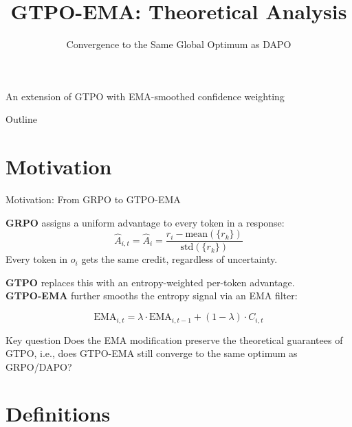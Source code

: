 \documentclass[aspectratio=169, 11pt]{beamer}
\title{GTPO-EMA: Theoretical Analysis}
\subtitle{Convergence to the Same Global Optimum as DAPO}
\author{}
\date{}
\newcommand{\EMA}{\mathrm{EMA}}
\begin{document}
\begin{frame}
\titlepage
\vspace{-1em}
\begin{center}
\textcolor{midgray}{\small An extension of GTPO with EMA-smoothed confidence weighting}
\end{center}
\end{frame}

\begin{frame}{Outline}
\tableofcontents
\end{frame}

\section{Motivation}

\begin{frame}{Motivation: From GRPO to GTPO-EMA}

\textbf{GRPO} assigns a uniform advantage to every token in a response:
\[
\hat{A}_{i,t} = \hat{A}_i = \frac{r_i - \mathrm{mean}(\{r_k\})}{\mathrm{std}(\{r_k\})}
\]
Every token in $o_i$ gets the same credit, regardless of uncertainty.

\medskip
\textbf{GTPO} replaces this with an entropy-weighted per-token advantage. \\
\textbf{GTPO-EMA} further smooths the entropy signal via an EMA filter:

\[
\EMA_{i,t} = \lambda \cdot \EMA_{i,t-1} + (1-\lambda) \cdot C_{i,t}
\]

\begin{block}{Key question}
Does the EMA modification preserve the theoretical guarantees of GTPO,
i.e., does GTPO-EMA still converge to the same optimum as GRPO/DAPO?
\end{block}

\end{frame}

\section{Definitions}
\end{document}
